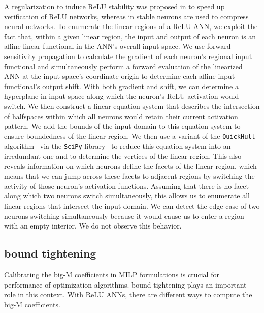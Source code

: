 A regularization to induce ReLU stability was proposed in \citet{Xiao2019} to speed up verification of ReLU networks, whereas in \citet{Serra2020} stable neurons are used to compress neural networks. 
To enumerate the linear regions of a ReLU ANN, we exploit the fact that, within a given linear region, the input and output of each neuron is an affine linear functional in the ANN's overall input space. We use forward sensitivity propagation to calculate the gradient of each neuron's regional input functional and simultaneously perform a forward evaluation of the linearized ANN at the input space's coordinate origin to determine each affine input functional's output shift. With both gradient and shift, we can determine a hyperplane in input space along which the neuron's ReLU activation would switch. We then construct a linear equation system that describes the intersection of halfspaces within which all neurons would retain their current activation pattern. We add the bounds of the input domain to this equation system to ensure boundedness of the linear region. We then use a variant of the \texttt{QuickHull} algorithm~\citep{Barber1996} via the \texttt{SciPy} library~\citep{SciPy2020} to reduce this equation system into an irredundant one and to determine the vertices of the linear region. This also reveals information on which neurons define the facets of the linear region, which means that we can jump across these facets to adjacent regions by switching the activity of those neuron's activation functions. Assuming that there is no facet along which two neurons switch simultaneously, this allows us to enumerate all linear regions that intersect the input domain. We can detect the edge case of two neurons switching simultaneously because it would cause us to enter a region with an empty interior. We do not observe this behavior. 

\subsection{bound tightening} \label{subsec:boundtightening}

Calibrating the big-M coefficients in MILP formulations is crucial for performance of optimization algorithms. bound tightening plays an important role in this context. With ReLU ANNs, there are different ways to compute the big-M coefficients.
%
